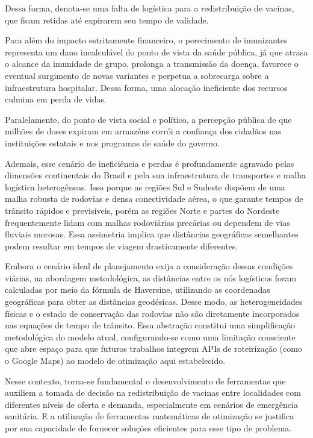 Dessa forma, denota-se uma falta de logística para a redistribuição de vacinas, que ficam retidas até expirarem seu tempo de validade.

Para além do impacto estritamente financeiro, o perecimento de imunizantes representa um dano incalculável do ponto de vista da saúde pública, já que atrasa o alcance da imunidade de grupo, prolonga a transmissão da doença, favorece o eventual surgimento de novas variantes e perpetua a sobrecarga sobre a infraestrutura hospitalar. Dessa forma, uma alocação ineficiente dos recursos culmina em perda de vidas.

Paralelamente, do ponto de vista social e político, a percepção pública de que milhões de doses expiram em armazéns corrói a confiança dos cidadãos nas instituições estatais e nos programas de saúde do governo.

Ademais, esse cenário de ineficiência e perdas é profundamente agravado pelas dimensões continentais do Brasil e pela sua infraestrutura de transportes e malha logística heterogêneas. Isso porque as regiões Sul e Sudeste dispõem de uma malha robusta de rodovias e densa conectividade aérea, o que garante tempos de trânsito rápidos e previsíveis, porém as regiões Norte e partes do Nordeste frequentemente lidam com malhas rodoviárias precárias ou dependem de vias fluviais morosas. Essa assimetria implica que distâncias geográficas semelhantes podem resultar em tempos de viagem drasticamente diferentes.

Embora o cenário ideal de planejamento exija a consideração dessas condições viárias, na abordagem metodológica, as distâncias entre os nós logísticos foram calculadas por meio da fórmula de Haversine, utilizando as coordenadas geográficas para obter as distâncias geodésicas. Desse modo, as heterogeneidades físicas e o estado de conservação das rodovias não são diretamente incorporados nas equações de tempo de trânsito. Essa abstração constitui uma simplificação metodológica do modelo atual, configurando-se como uma limitação consciente que abre espaço para que futuros trabalhos integrem APIs de roteirização (como o Google Maps) ao modelo de otimização aqui estabelecido.

Nesse contexto, torna-se fundamental o desenvolvimento de ferramentas que auxiliem a tomada de decisão na redistribuição de vacinas entre localidades com diferentes níveis de oferta e demanda, especialmente em cenários de emergência sanitária. E a utilização de ferramentas matemáticas de otimização se justifica por sua capacidade de fornecer soluções eficientes para esse tipo de problema.

